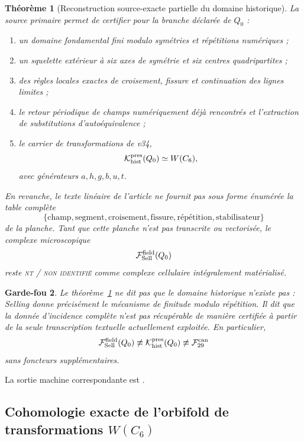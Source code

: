 \documentclass[11pt,a4paper]{article}
\newtheorem{theorem}{Théorème}[section]
\newtheorem{guardrail}[theorem]{Garde-fou}
\newcommand{\statusNT}{\textsc{nt / non identifié}}
\begin{document}
\begin{theorem}[Reconstruction source-exacte partielle du domaine historique]\label{thm:v36-field-domain-gate}
La source primaire permet de certifier pour la branche déclarée de $Q_0$ :
\begin{enumerate}[label=\textup{(\alph*)}]
\item un domaine fondamental fini modulo symétries et répétitions numériques ;
\item un squelette extérieur à six axes de symétrie et six centres quadripartites ;
\item des règles locales exactes de croisement, fissure et continuation des lignes limites ;
\item le retour périodique de champs numériquement déjà rencontrés et l'extraction de substitutions d'autoéquivalence ;
\item le carrier de transformations de v34,
\[
\mathcal K_{\rm hist}^{\rm pres}(Q_0)\simeq W(C_6),
\]
avec générateurs $a,h,g,b,u,t$.
\end{enumerate}
En revanche, le texte linéaire de l'article ne fournit pas sous forme énumérée la table complète
\[
\{\text{champ},\text{segment},\text{croisement},\text{fissure},\text{répétition},\text{stabilisateur}\}
\]
de la planche. Tant que cette planche n'est pas transcrite ou vectorisée, le complexe microscopique
\[
\mathcal F_{\rm Sell}^{\rm field}(Q_0)
\]
reste \statusNT{} comme complexe cellulaire intégralement matérialisé.
\end{theorem}

\begin{guardrail}
Le théorème~\ref{thm:v36-field-domain-gate} ne dit pas que le domaine historique n'existe pas : Selling donne précisément le mécanisme de finitude modulo répétition. Il dit que la donnée d'incidence complète n'est pas récupérable de manière certifiée à partir de la seule transcription textuelle actuellement exploitée. En particulier,
\[
\mathcal F_{\rm Sell}^{\rm field}(Q_0)
\not\equiv
\mathcal K_{\rm hist}^{\rm pres}(Q_0)
\not\equiv
\mathcal F_{29}^{\rm can}
\]
sans foncteurs supplémentaires.
\end{guardrail}

La sortie machine correspondante est .

\subsection{Cohomologie exacte de l'orbifold de transformations $W(C_6)$}
\end{document}
